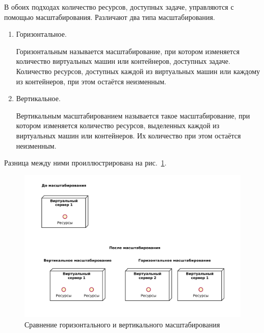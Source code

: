 В обоих подходах количество ресурсов, доступных задаче, управляются с помощью масштабирования. Различают два типа масштабирования.
\begin{enumerate}
    \item Горизонтальное.
    
    Горизонтальным называется масштабирование, при котором изменяется количество виртуальных машин или контейнеров, доступных задаче.
    Количество ресурсов, доступных каждой из виртуальных машин или каждому из контейнеров, при этом остаётся неизменным.
    \item Вертикальное.
    
    Вертикальным масштабированием называется такое масштабирование, при котором изменяется количество ресурсов, выделенных каждой из виртуальных машин или контейнеров.
    Их количество при этом остаётся неизменным.
\end{enumerate}
Разница между ними проиллюстрирована на рис.~\ref{scale-out-up}.

\begin{figure}[hbtp]
    \centering
    \includegraphics[width=\textwidth]{img/scale-out-up.pdf}
    \caption{Сравнение горизонтального и вертикального масштабирования}
    \label{scale-out-up}
\end{figure}

